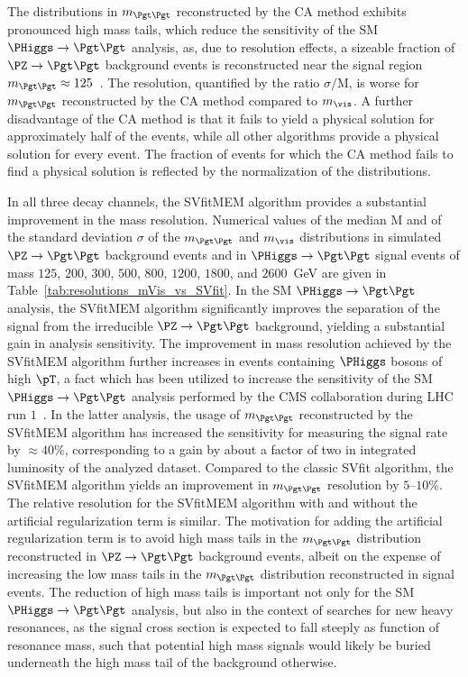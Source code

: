 The distributions in $m_{\Pgt\Pgt}$ reconstructed by the CA method
exhibits pronounced high mass tails, which reduce the sensitivity of the SM $\PHiggs \to \Pgt\Pgt$ analysis,
as, due to resolution effects, a sizeable fraction of $\PZ \to \Pgt\Pgt$ background events
is reconstructed near the signal region $m_{\Pgt\Pgt} \approx 125$~\GeV.
The resolution, quantified by the ratio $\sigma/\textrm{M}$,
is worse for $m_{\Pgt\Pgt}$ reconstructed by the CA method compared to $m_{\vis}$.
A further disadvantage of the CA method is that it fails to yield a physical solution for approximately half of the events,
while all other algorithms provide a physical solution for every event.
The fraction of events for which the CA method fails to find a physical solution is reflected by the normalization of the distributions.

In all three decay channels, the SVfitMEM algorithm provides a substantial improvement in the mass resolution.
Numerical values of the median $\textrm{M}$ and of the standard deviation $\sigma$ 
of the $m_{\Pgt\Pgt}$ and $m_{\vis}$ distributions in simulated $\PZ \to \Pgt\Pgt$ background events
and in $\PHiggs \to \Pgt\Pgt$ signal events of mass $125$, $200$, $300$, $500$, $800$, $1200$, $1800$, and $2600$~GeV
are given in Table~\ref{tab:resolutions_mVis_vs_SVfit}.
In the SM $\PHiggs \to \Pgt\Pgt$ analysis,
the SVfitMEM algorithm significantly improves the separation of the signal 
from the irreducible $\PZ \to \Pgt\Pgt$ background, yielding a substantial gain in analysis sensitivity.
The improvement in mass resolution achieved by the SVfitMEM algorithm
further increases in events containing $\PHiggs$ bosons of high $\pT$,
a fact which has been utilized to increase the sensitivity of the SM $\PHiggs \to \Pgt\Pgt$ analysis performed by the CMS collaboration during LHC run $1$~\cite{HIG-13-004}.
In the latter analysis, the usage of $m_{\Pgt\Pgt}$ reconstructed by the SVfitMEM algorithm
has increased the sensitivity for measuring the signal rate by $\approx 40\%$,
corresponding to a gain by about a factor of two in integrated luminosity of the analyzed dataset.
Compared to the classic SVfit algorithm, the SVfitMEM algorithm yields an improvement in $m_{\Pgt\Pgt}$ resolution by $5$--$10\%$.
The relative resolution for the SVfitMEM algorithm with and without the artificial regularization term is similar.
The motivation for adding the artificial regularization term is to avoid high mass tails in the $m_{\Pgt\Pgt}$ distribution
reconstructed in $\PZ \to \Pgt\Pgt$ background events,
albeit on the expense of increasing the low mass tails in the $m_{\Pgt\Pgt}$ distribution reconstructed in signal events.
The reduction of high mass tails is important not only for the SM $\PHiggs \to \Pgt\Pgt$ analysis,
but also in the context of searches for new heavy resonances,
as the signal cross section is expected to fall steeply as function of resonance mass,
such that potential high mass signals would likely be buried underneath the high mass tail of the background otherwise.

